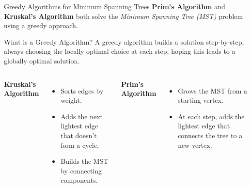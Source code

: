 \documentclass{beamer}
\begin{document}
\begin{frame}{Greedy Algorithms for Minimum Spanning Trees}
\textbf{Prim's Algorithm} and \textbf{Kruskal's Algorithm} both solve the \emph{Minimum Spanning Tree (MST)} problem using a \alert{greedy approach}.

\vspace{1em}
\begin{block}{What is a Greedy Algorithm?}
A greedy algorithm builds a solution step-by-step, always choosing the \alert{locally optimal} choice at each step, hoping this leads to a globally optimal solution.
\end{block}

\vspace{1em}
\begin{columns}
\textbf{Kruskal's Algorithm}
\begin{itemize}
    \item Sorts edges by weight.
    \item Adds the next lightest edge that doesn’t form a cycle.
    \item Builds the MST by connecting components.
\end{itemize}

\textbf{Prim's Algorithm}
\begin{itemize}
    \item Grows the MST from a starting vertex.
    \item At each step, adds the lightest edge that connects the tree to a new vertex.
\end{itemize}
\end{columns}


\end{frame}
\end{document}
